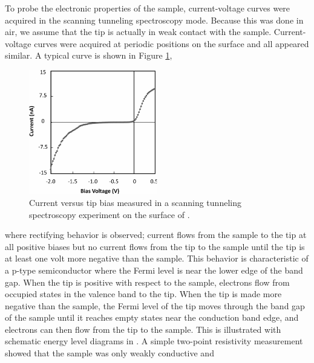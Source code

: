 To probe the electronic properties of the sample, current-voltage curves were acquired in
the scanning tunneling spectroscopy mode. Because this was done in air, we assume that the
tip is actually in weak contact with the sample. Current-voltage curves were acquired at
periodic positions on the surface and all appeared similar. A typical curve is shown in
Figure \ref{fig:bfofig4},
\begin{figure}
\begin{center}
	\includegraphics[width=0.5\textwidth]{bfofig4.pdf}
		\caption[Scanning tunneling spectroscopy measurement of ]{%
			Current versus tip bias measured in a scanning tunneling spectroscopy 
	experiment on the surface of .}
	\label{fig:bfofig4}
\end{center}
\end{figure}
where rectifying behavior is observed; current flows from the sample to the tip at all
positive biases but no current flows from the tip to the sample until the tip is at least
one volt more negative than the sample. This behavior is characteristic of a p-type
semiconductor where the Fermi level is near the lower edge of the band gap. When the tip
is positive with respect to the sample, electrons flow from occupied states in the valence
band to the tip. When the tip is made more negative than the sample, the Fermi level of
the tip moves through the band gap of the sample until it reaches empty states near the
conduction band edge, and electrons can then flow from the tip to the sample. This is
illustrated with schematic energy level diagrams in . A simple
two-point resistivity measurement showed that the sample was only weakly conductive and

